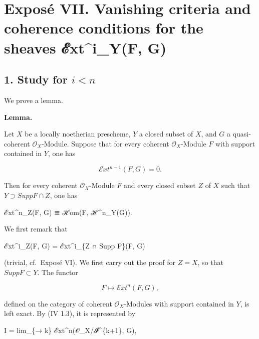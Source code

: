 \documentclass[
]{article}
\newenvironment{Shaded}{}{}
\newcommand{\NormalTok}[1]{#1}
\begin{document}
\section{Exposé VII. Vanishing criteria and coherence conditions for the
sheaves ℰxt\^{}i\_Y(F,
G)}\label{exposuxe9-vii.-vanishing-criteria-and-coherence-conditions-for-the-sheaves-ux2130xti_yf-g}

\subsection{\texorpdfstring{1. Study for
\(i < n\)}{1. Study for i \textless{} n}}\label{study-for-i-n}

We prove a lemma.

\textbf{Lemma.}

Let \(X\) be a locally noetherian prescheme, \(Y\) a closed subset of
\(X\), and \(G\) a quasi-coherent \(\mathcal{O}_{X}\)-Module. Suppose
that for every coherent \(\mathcal{O}_{X}\)-Module \(F\) with support
contained in \(Y\), one has

\[
\mathcal{E}xt^{n-1}(F, G) = 0.
\]

Then for every coherent \(\mathcal{O}_{X}\)-Module \(F\) and every
closed subset \(Z\) of \(X\) such that \(Y \supset Supp F \cap Z\), one
has

\begin{Shaded}
\begin{Highlighting}[]
\NormalTok{ℰxt\^{}n\_Z(F, G) ≅ ℋom(F, ℋ\^{}n\_Y(G)).}
\end{Highlighting}
\end{Shaded}

We first remark that

\begin{Shaded}
\begin{Highlighting}[]
\NormalTok{ℰxt\^{}i\_Z(F, G) = ℰxt\^{}i\_\{Z ∩ Supp F\}(F, G)}
\end{Highlighting}
\end{Shaded}

(trivial, cf.~Exposé VI). We first carry out the proof for \(Z = X\), so
that \(Supp F \subset Y\). The functor

\[
F \mapsto \mathcal{E}xt^{n}(F, G),
\]

defined on the category of coherent \(\mathcal{O}_{X}\)-Modules with
support contained in \(Y\), is left exact. By (IV 1.3), it is
represented by

\begin{Shaded}
\begin{Highlighting}[]
\NormalTok{I = lim\_\{→ k\} ℰxt\^{}n(𝒪\_X/𝓘\^{}\{k+1\}, G),}
\end{Highlighting}
\end{Shaded}
\end{document}
